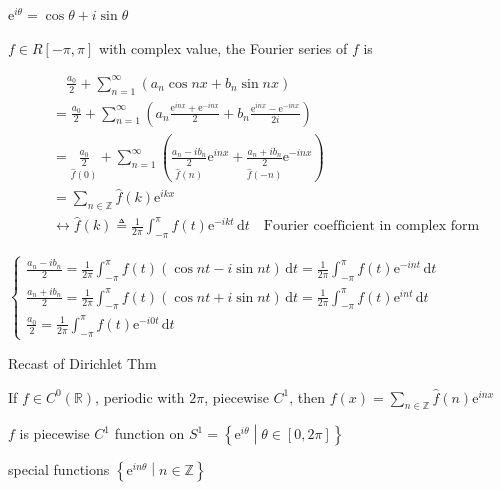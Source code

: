 $\mathrm{e}^{i\theta}=\cos\theta+i\sin\theta$

$f\in R[-\pi,\pi]$ with complex value, the Fourier series of $f$ is

\begin{align*}
     & \quad\frac{a_0}{2}+\sum_{n=1}^{\infty}\left(a_n\cos nx+b_n\sin nx\right)                                                                                                                    \\
     & =\frac{a_0}{2}+\sum_{n=1}^{\infty}\left(a_n\frac{\mathrm{e}^{inx}+\mathrm{e}^{-inx}}{2}+b_n\frac{\mathrm{e}^{inx}-\mathrm{e}^{-inx}}{2i}\right)                                             \\
     & =\underset{\hat{f}(0)}{\frac{a_0}{2}}+\sum_{n=1}^{\infty}\left(\underset{\hat{f}(n)}{\frac{a_n-ib_n}{2}}\mathrm{e}^{inx}+\underset{\hat{f}(-n)}{\frac{a_n+ib_n}{2}}\mathrm{e}^{-inx}\right) \\
     & =\sum_{n\in\mathbb{Z}}\hat{f}(k)\mathrm{e}^{ikx}                                                                                                                                            \\
     & \leftrightarrow\hat{f}(k)\triangleq\frac{1}{2\pi}\int_{-\pi}^{\pi}f(t)\mathrm{e}^{-ikt}\,\mathrm{d}t\quad\text{Fourier coefficient in complex form}
\end{align*}

$\begin{cases}
        \frac{a_n-ib_n}{2}=\frac{1}{2\pi}\int_{-\pi}^{\pi}f(t)\left(\cos nt-i\sin nt\right)\,\mathrm{d}t=\frac{1}{2\pi}\int_{-\pi}^{\pi}f(t)\mathrm{e}^{-int}\,\mathrm{d}t \\
        \frac{a_n+ib_n}{2}=\frac{1}{2\pi}\int_{-\pi}^{\pi}f(t)\left(\cos nt+i\sin nt\right)\,\mathrm{d}t=\frac{1}{2\pi}\int_{-\pi}^{\pi}f(t)\mathrm{e}^{int}\,\mathrm{d}t  \\
        \frac{a_0}{2}=\frac{1}{2\pi}\int_{-\pi}^{\pi}f(t)\mathrm{e}^{-i0t}\,\mathrm{d}t
    \end{cases}$

Recast of Dirichlet Thm

If $f\in C^0(\mathbb{R})$, periodic with $2\pi$, piecewise $C^1$, then $f(x)=\sum_{n\in\mathbb{Z}}\hat{f}(n)\mathrm{e}^{inx}$

$f$ is piecewise $C^1$ function on $S^1=\left\{\mathrm{e}^{i\theta}\middle|\theta\in[0,2\pi]\right\}$

special functions $\left\{\mathrm{e}^{in\theta}\middle|n\in\mathbb{Z}\right\}$

